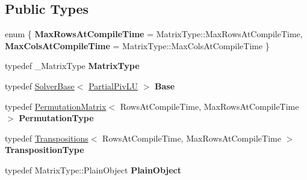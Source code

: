 \subsection*{Public Types}
\begin{DoxyCompactItemize}
\item 
\mbox{\label{class_eigen_1_1_partial_piv_l_u_ab1d2681d0e6822e8e2b7276bddb64879}} 
enum \{ {\bfseries Max\+Rows\+At\+Compile\+Time} = Matrix\+Type\+::Max\+Rows\+At\+Compile\+Time, 
{\bfseries Max\+Cols\+At\+Compile\+Time} = Matrix\+Type\+::Max\+Cols\+At\+Compile\+Time
 \}
\item 
\mbox{\label{class_eigen_1_1_partial_piv_l_u_a0736a02bea471dbed733a1fb2cebb678}} 
typedef \+\_\+\+Matrix\+Type {\bfseries Matrix\+Type}
\item 
\mbox{\label{class_eigen_1_1_partial_piv_l_u_a2131c6ccbf78c1dcfe862654beed1272}} 
typedef \mbox{\hyperlink{class_eigen_1_1_solver_base}{Solver\+Base}}$<$ \mbox{\hyperlink{class_eigen_1_1_partial_piv_l_u}{Partial\+Piv\+LU}} $>$ {\bfseries Base}
\item 
\mbox{\label{class_eigen_1_1_partial_piv_l_u_a5b5f010f3e7acdff7b7c72db874dc3d9}} 
typedef \mbox{\hyperlink{class_eigen_1_1_permutation_matrix}{Permutation\+Matrix}}$<$ Rows\+At\+Compile\+Time, Max\+Rows\+At\+Compile\+Time $>$ {\bfseries Permutation\+Type}
\item 
\mbox{\label{class_eigen_1_1_partial_piv_l_u_acf0c9c89566e8aba4fae8f470c5a8d4a}} 
typedef \mbox{\hyperlink{class_eigen_1_1_transpositions}{Transpositions}}$<$ Rows\+At\+Compile\+Time, Max\+Rows\+At\+Compile\+Time $>$ {\bfseries Transposition\+Type}
\item 
\mbox{\label{class_eigen_1_1_partial_piv_l_u_aaae954615fa4a1dd947fe7d380bf7206}} 
typedef Matrix\+Type\+::\+Plain\+Object {\bfseries Plain\+Object}
\end{DoxyCompactItemize}
